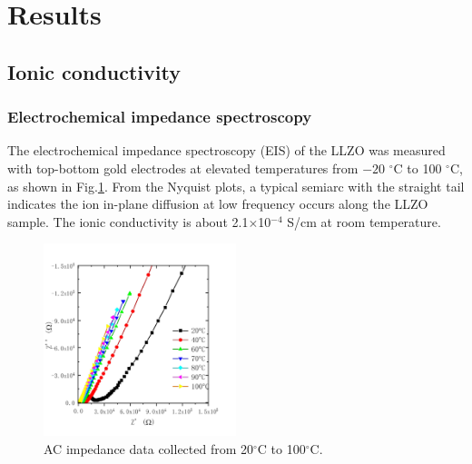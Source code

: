\documentclass[twoside,twocolumn,9pt]{article}
\begin{document}
%

%

\section{Results}

\subsection{Ionic conductivity}

\subsubsection{Electrochemical impedance spectroscopy}

The electrochemical impedance spectroscopy (EIS) of the LLZO was measured with top-bottom gold electrodes at elevated temperatures from $-20$ $^\circ$C to 100 $^\circ$C, as shown in  Fig.\ref{fig:impedance}.
From the Nyquist plots, a typical semiarc with the straight tail indicates the ion in-plane diffusion at low frequency occurs along the LLZO sample.
The ionic conductivity is about 2.1$\times$10$^{-4}$ S/cm at room temperature.

\begin{figure}[t]
\centering
\includegraphics[width=0.5\textwidth]{Pics/Nyquist.pdf}
\caption{AC impedance data collected from 20$^\circ$C to 100$^\circ$C.}
\label{fig:impedance}
\end{figure}
\end{document}
